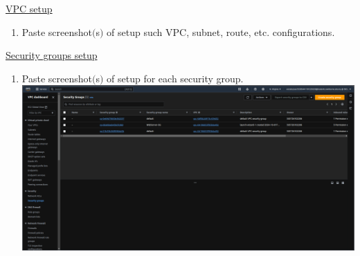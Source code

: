 \documentclass[11pt]{article}
\begin{document}
\vspace{1.5cm}

\newpage

\noindent\underline{VPC setup}

\begin{enumerate}
    \item Paste screenshot$($s$)$ of setup such VPC, subnet, route, etc. configurations.\\
    \vspace{5mm}
    
    
\end{enumerate}


\vspace{1cm}



\noindent\underline{Security groups setup}
\begin{enumerate}[resume]
    \item Paste screenshot$($s$)$ of setup for each security group. \\

    {\centering
    \includegraphics[width=5.8in]{pics/10.png}
    }


\end{enumerate}


\newpage
\end{document}
